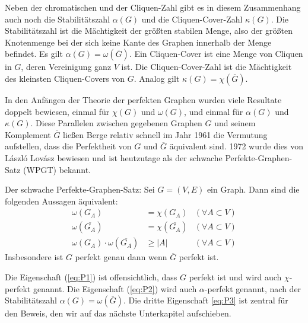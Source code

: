 \documentclass[../main.tex]{subfiles}
\begin{document}
Neben der chromatischen und der Cliquen-Zahl gibt es in diesem Zusammenhang auch noch die Stabilitätszahl $\alpha(G)$ und die Cliquen-Cover-Zahl $\kappa(G)$. Die Stabilitätszahl ist die Mächtigkeit der größten stabilen Menge, also der größten Knotenmenge bei der sich keine Kante des Graphen innerhalb der Menge befindet. Es gilt $\alpha(G) = \omega(\overline G)$. Ein Cliquen-Cover ist eine Menge von Cliquen in $G$, deren Vereinigung ganz $V$ ist. Die Cliquen-Cover-Zahl ist die Mächtigkeit des kleinsten Cliquen-Covers von $G$. Analog gilt $\kappa(G) = \chi(\overline G)$.

In den Anfängen der Theorie der perfekten Graphen wurden viele Resultate doppelt bewiesen, einmal für $\chi(G)$ und $\omega(G)$, und einmal für $\alpha(G)$ und $\kappa(G)$. Diese Parallelen zwischen gegebenen Graphen $G$ und seinem Komplement $\overline G$ ließen Berge relativ schnell im Jahr 1961 die Vermutung aufstellen, dass die Perfektheit von $G$ und $\overline G$ äquivalent sind. 1972 wurde dies von László Lovász bewiesen und ist heutzutage als der schwache Perfekte-Graphen-Satz (WPGT) bekannt.

\begin{satz}
    \label{thm:wpgt}
    Der schwache Perfekte-Graphen-Satz: Sei $G = (V, E)$ ein Graph. Dann sind die folgenden Aussagen äquivalent:
    \begin{align}
        \omega(G_A) &= \chi(G_A) &(\forall A \subset V) \tag{P1}\label{eq:P1}\\
        \omega(\overline{G_A}) &= \chi(\overline{G_A}) &(\forall A \subset V) \tag{P2}\label{eq:P2}\\
        \omega(G_A) \cdot \omega(\overline{G_A}) &\geq |A| &(\forall A \subset V) \tag{P3}\label{eq:P3}
    \end{align}
    Insbesondere ist $G$ perfekt genau dann wenn $\overline G$ perfekt ist.
\end{satz}

Die Eigenschaft (\ref{eq:P1}) ist offensichtlich, dass $G$ perfekt ist und wird auch $\chi$-perfekt genannt. Die Eigenschaft (\ref{eq:P2}) wird auch $\alpha$-perfekt genannt, nach der Stabilitätszahl $\alpha(G) = \omega(\overline G)$. Die dritte Eigenschaft \eqref{eq:P3} ist zentral für den Beweis, den wir auf das nächste Unterkapitel aufschieben.
\end{document}
